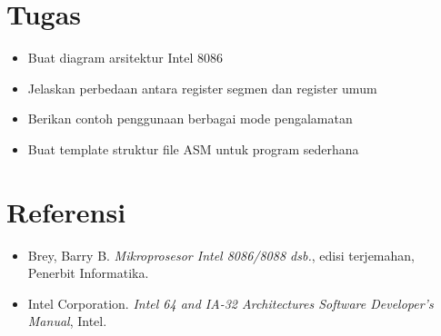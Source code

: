 \section{Tugas}
\begin{itemize}
\item Buat diagram arsitektur Intel 8086
\item Jelaskan perbedaan antara register segmen dan register umum
\item Berikan contoh penggunaan berbagai mode pengalamatan
\item Buat template struktur file ASM untuk program sederhana
\end{itemize}

\section{Referensi}
\begin{itemize}
\item Brey, Barry B. \textit{Mikroprosesor Intel 8086/8088 dsb.}, edisi terjemahan, Penerbit Informatika.
\item Intel Corporation. \textit{Intel 64 and IA-32 Architectures Software Developer's Manual}, Intel.
\end{itemize}

